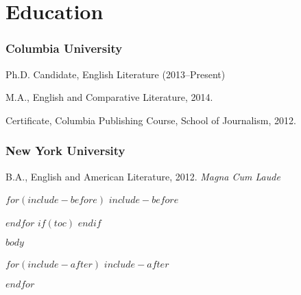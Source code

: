 \documentclass[11pt]{article}
\begin{document}
\bigskip\bigskip\medskip
{}
\reversemarginpar
\bigskip 

\section*{Education}

\subsubsection{Columbia University}

Ph.D. Candidate, English Literature (2013–Present)
 
\smallskip

M.A., English and Comparative Literature, 2014.

\smallskip

Certificate, Columbia Publishing Course, School of Journalism, 2012.

\medskip

\subsubsection{New York University}

B.A., English and American Literature, 2012. \emph{Magna Cum Laude} %

\medskip

$for(include-before)$
$include-before$

$endfor$
$if(toc)$
\tableofcontents
$endif$

$body$

$for(include-after)$
$include-after$

$endfor$
\end{document}
